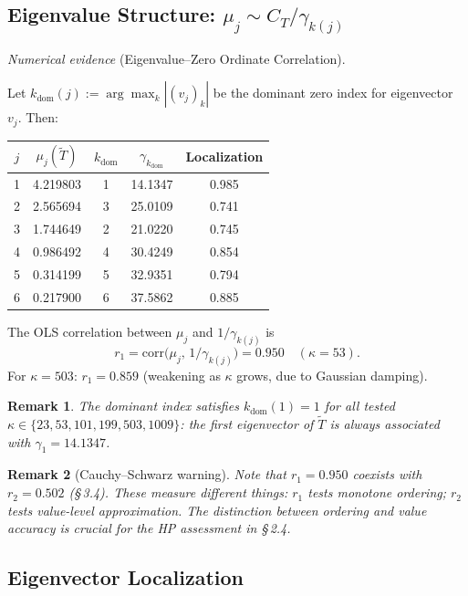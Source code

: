 \documentclass[11pt]{article}
\newtheorem*{remark}{Remark}
\newcommand{\Tt}{\widetilde{T}}
\newcommand{\CT}{C_{T}}
\newcommand{\kdom}{k_{\mathrm{dom}}}
\begin{document}
\subsection{Eigenvalue Structure: $\mu_j \sim \CT/\gamma_{k(j)}$}

\emph{Numerical evidence} (Eigenvalue--Zero Ordinate Correlation).

Let $\kdom(j) := \arg\max_k|(v_j)_k|$ be the dominant zero index
for eigenvector $v_j$. Then:

\begin{center}
\begin{tabular}{ccccc}
\toprule
$j$ & $\mu_j(\Tt)$ & $\kdom$ & $\gamma_{\kdom}$ & Localization \\
\midrule
1 & 4.219803 & 1 & 14.1347 & 0.985 \\
2 & 2.565694 & 3 & 25.0109 & 0.741 \\
3 & 1.744649 & 2 & 21.0220 & 0.745 \\
4 & 0.986492 & 4 & 30.4249 & 0.854 \\
5 & 0.314199 & 5 & 32.9351 & 0.794 \\
6 & 0.217900 & 6 & 37.5862 & 0.885 \\
\bottomrule
\end{tabular}
\end{center}

The OLS correlation between $\mu_j$ and $1/\gamma_{k(j)}$ is
\[
r_1 = \mathrm{corr}\bigl(\mu_j,\,1/\gamma_{k(j)}\bigr) = 0.950
\quad(\kappa=53).
\]
For $\kappa=503$: $r_1 = 0.859$ (weakening as $\kappa$ grows,
due to Gaussian damping).

\begin{remark}
The dominant index satisfies $\kdom(1) = 1$ for all tested
$\kappa\in\{23,53,101,199,503,1009\}$:
the first eigenvector of $\Tt$ is always associated with
$\gamma_1 = 14.1347$.
\end{remark}

\begin{remark}[Cauchy--Schwarz warning]
Note that $r_1 = 0.950$ coexists with $r_2 = 0.502$ (\S\,3.4).
These measure different things: $r_1$ tests monotone ordering;
$r_2$ tests value-level approximation.
The distinction between ordering and value accuracy is crucial for
the HP assessment in \S\,2.4.
\end{remark}

\subsection{Eigenvector Localization}
\end{document}
